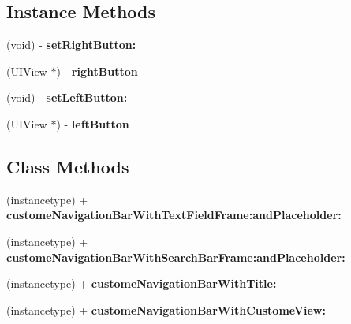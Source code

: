 \subsection*{Instance Methods}
\begin{DoxyCompactItemize}
\item 
\mbox{\label{interface_f_n_custome_navigation_bar_a49217f5fcbdca480756546daf22d5bb8}} 
(void) -\/ {\bfseries set\+Right\+Button\+:}
\item 
\mbox{\label{interface_f_n_custome_navigation_bar_a1526e61a47c5340edf769a73132c125b}} 
(U\+I\+View $\ast$) -\/ {\bfseries right\+Button}
\item 
\mbox{\label{interface_f_n_custome_navigation_bar_a6a2123c1e197a7b0e0af437a3994eb80}} 
(void) -\/ {\bfseries set\+Left\+Button\+:}
\item 
\mbox{\label{interface_f_n_custome_navigation_bar_afe47ab9b9d594e2ceee429d5f916295f}} 
(U\+I\+View $\ast$) -\/ {\bfseries left\+Button}
\end{DoxyCompactItemize}
\subsection*{Class Methods}
\begin{DoxyCompactItemize}
\item 
\mbox{\label{interface_f_n_custome_navigation_bar_a739dfe60b9d6dcb5bdc557bf1cdf3a78}} 
(instancetype) + {\bfseries custome\+Navigation\+Bar\+With\+Text\+Field\+Frame\+:and\+Placeholder\+:}
\item 
\mbox{\label{interface_f_n_custome_navigation_bar_a0501d5b27ff4fe498e106c70cf98baab}} 
(instancetype) + {\bfseries custome\+Navigation\+Bar\+With\+Search\+Bar\+Frame\+:and\+Placeholder\+:}
\item 
\mbox{\label{interface_f_n_custome_navigation_bar_aca0956feab57ab93c3b61b8b3ffabd45}} 
(instancetype) + {\bfseries custome\+Navigation\+Bar\+With\+Title\+:}
\item 
\mbox{\label{interface_f_n_custome_navigation_bar_a095fec53e474d17d67557ba8129dff9e}} 
(instancetype) + {\bfseries custome\+Navigation\+Bar\+With\+Custome\+View\+:}
\end{DoxyCompactItemize}
